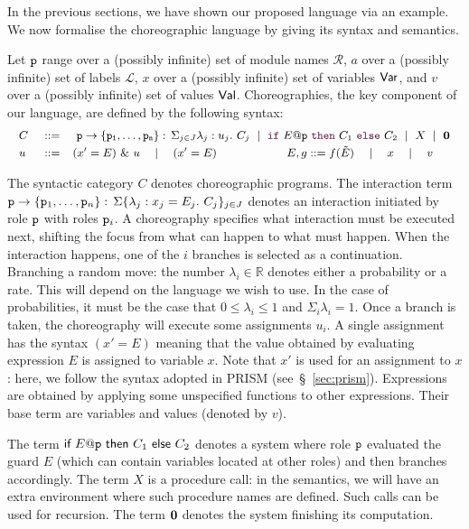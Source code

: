 In the previous sections, we have shown our proposed language via an
example. We now formalise the choreographic language by giving its
syntax and semantics.

%
Let $\mathtt{p}$ range over a (possibly infinite) set of module names
$\mathcal R$, $a$ over a (possibly infinite) set of labels
$\mathcal L$, $x$ over a (possibly infinite) set of variables
$\mathsf{Var}$, and $v$ over a (possibly infinite) set of values
$\mathsf{Val}$.
%
Choreographies, the key component of our language, are defined by the
following syntax:
%
\begin{displaymath}\small
  \begin{array}{llllllllllll}
    C \ & ::= & \
      \interact{p}{\role p_1,\ldots,\role p_n}
      \ \mid\
      \ifTE {E}{p}{C_1}{C_2}
      \ \mid\ X \ \mid\  \CEnd
    \\[1mm]
    u     & ::=  & (x' = E)\ \&\ u \quad\mid\quad    (x' = E)
    \qquad\qquad\qquad
    E, g     ::=        f(\tilde E)\quad\mid\quad x\quad\mid\quad v

  \end{array}
\end{displaymath}

The syntactic category $C$ denotes choreographic programs. The
interaction term
$\mathtt{p}\rightarrow \{\mathtt{p}_1,\ldots,\mathtt{p}_n\}:\,\Sigma\{\lambda_j:
x_j=E_j.\ C_j\}_{j\in J}$ denotes an interaction initiated by role
$\mathtt{p}$ with roles $\mathtt{p}_i$. A choreography specifies what
interaction must be executed next, shifting the focus from what can
happen to what must happen. When the interaction happens, one of the
$i$ branches is selected as a continuation. Branching a random move:
the number $\lambda_i\in\mathbb R$ denotes either a probability or a
rate. This will depend on the language we wish to use. In the case of
probabilities, it must be the case that $0\leq\lambda_i\leq 1$ and
$\Sigma_i\lambda_i=1$. Once a branch is taken, the choreography will
execute some assignments $u_i$. A single assignment has the syntax
$(x' = E)$ meaning that the value obtained by evaluating expression
$E$ is assigned to variable $x$. Note that $x'$ is used for an
assignment to $x$: here, we follow the syntax adopted in PRISM
(see~\S~\ref{sec:prism}). Expressions are obtained by applying some
unspecified functions to other expressions. Their base term are
variables and values (denoted by $v$).
%

The term
$\textsf{if } E@\mathtt{p} \textsf{ then } C_1 \textsf{ else } C_2$
denotes a system where role $\mathtt{p}$ evaluated the guard $E$ (which
can contain variables located at other roles) and then branches
accordingly.  The term $X$ is a procedure call: in the semantics, we
will have an extra environment where such procedure names are
defined. Such calls can be used for recursion. The term $\mathbf{0}$
denotes the system finishing its computation.

